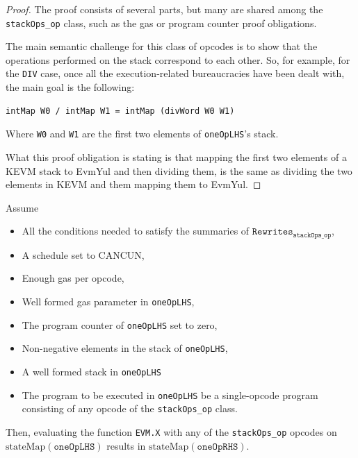 \begin{proof}

The proof consists of several parts, but many are shared among the
\texttt{stackOps_op} class, such as the gas or program counter proof
obligations.

The main semantic challenge for this class of opcodes is to show that the
operations performed on the stack correspond to each other. So, for example, for
the \texttt{DIV} case, once all the execution-related bureaucracies have been
dealt with, the main goal is the following:

\begin{verbatim}
intMap W0 / intMap W1 = intMap (divWord W0 W1)
\end{verbatim}

Where \texttt{W0} and \texttt{W1} are the first two elements of
\texttt{oneOpLHS}'s stack.

What this proof obligation is stating is that mapping the first two elements of
a KEVM stack to EvmYul and then dividing them, is the same as dividing the two
elements in KEVM and them mapping them to EvmYul.

\end{proof}

\begin{theorem}[X_oneOp]\label{thm:X_oneOp}
\leanok
{}

Assume

\begin{itemize}
\item All the conditions needed to satisfy the summaries of
  $\texttt{Rewrites}_{\texttt{stackOps_op}}$,
\item A schedule set to CANCUN,
\item Enough gas per opcode,
\item Well formed gas parameter in \texttt{oneOpLHS},
\item The program counter of \texttt{oneOpLHS} set to zero,
\item Non-negative elements in the stack of \texttt{oneOpLHS},
\item A well formed stack in \texttt{oneOpLHS}
\item The program to be executed in \texttt{oneOpLHS} be a single-opcode program
  consisting of any opcode of the \texttt{stackOps_op} class.
\end{itemize}

Then, evaluating the function \texttt{EVM.X} with any of the
\texttt{stackOps_op} opcodes on $\text{stateMap}(\texttt{oneOpLHS})$ results in
$\text{stateMap}(\texttt{oneOpRHS})$.

\end{theorem}

